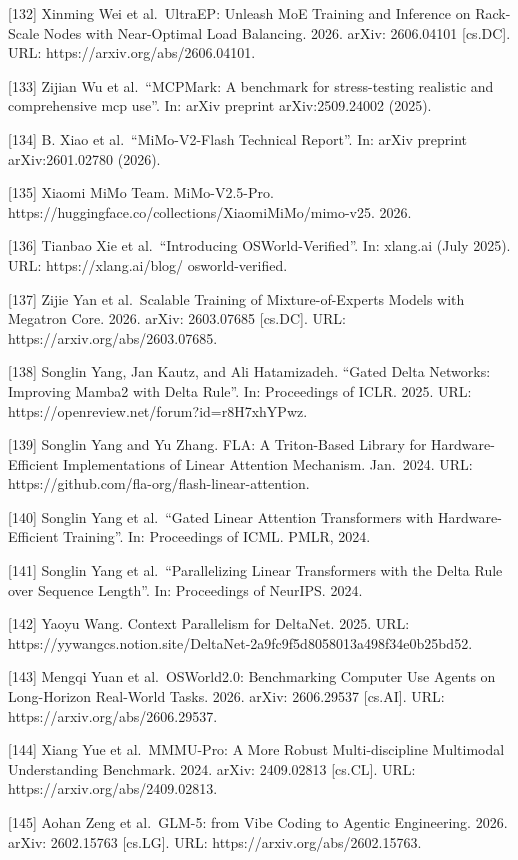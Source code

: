 \documentclass[
  10
]{article}
\begin{document}
{[}132{]} Xinming Wei et al.~UltraEP: Unleash MoE Training and Inference
on Rack-Scale Nodes with Near-Optimal Load Balancing. 2026. arXiv:
2606.04101 {[}cs.DC{]}. URL: https://arxiv.org/abs/2606.04101.

{[}133{]} Zijian Wu et al.~``MCPMark: A benchmark for stress-testing
realistic and comprehensive mcp use''. In: arXiv preprint
arXiv:2509.24002 (2025).

{[}134{]} B. Xiao et al.~``MiMo-V2-Flash Technical Report''. In: arXiv
preprint arXiv:2601.02780 (2026).

{[}135{]} Xiaomi MiMo Team. MiMo-V2.5-Pro.
https://huggingface.co/collections/XiaomiMiMo/mimo-v25. 2026.

{[}136{]} Tianbao Xie et al.~``Introducing OSWorld-Verified''. In:
xlang.ai (July 2025). URL: https://xlang.ai/blog/ osworld-verified.

{[}137{]} Zijie Yan et al.~Scalable Training of Mixture-of-Experts
Models with Megatron Core. 2026. arXiv: 2603.07685 {[}cs.DC{]}. URL:
https://arxiv.org/abs/2603.07685.

{[}138{]} Songlin Yang, Jan Kautz, and Ali Hatamizadeh. ``Gated Delta
Networks: Improving Mamba2 with Delta Rule''. In: Proceedings of ICLR.
2025. URL: https://openreview.net/forum?id=r8H7xhYPwz.

{[}139{]} Songlin Yang and Yu Zhang. FLA: A Triton-Based Library for
Hardware-Efficient Implementations of Linear Attention Mechanism.
Jan.~2024. URL: https://github.com/fla-org/flash-linear-attention.

{[}140{]} Songlin Yang et al.~``Gated Linear Attention Transformers with
Hardware-Efficient Training''. In: Proceedings of ICML. PMLR, 2024.

{[}141{]} Songlin Yang et al.~``Parallelizing Linear Transformers with
the Delta Rule over Sequence Length''. In: Proceedings of NeurIPS. 2024.

{[}142{]} Yaoyu Wang. Context Parallelism for DeltaNet. 2025. URL:
https://yywangcs.notion.site/DeltaNet-2a9fc9f5d8058013a498f34e0b25bd52.

{[}143{]} Mengqi Yuan et al.~OSWorld2.0: Benchmarking Computer Use
Agents on Long-Horizon Real-World Tasks. 2026. arXiv: 2606.29537
{[}cs.AI{]}. URL: https://arxiv.org/abs/2606.29537.

{[}144{]} Xiang Yue et al.~MMMU-Pro: A More Robust Multi-discipline
Multimodal Understanding Benchmark. 2024. arXiv: 2409.02813 {[}cs.CL{]}.
URL: https://arxiv.org/abs/2409.02813.

{[}145{]} Aohan Zeng et al.~GLM-5: from Vibe Coding to Agentic
Engineering. 2026. arXiv: 2602.15763 {[}cs.LG{]}. URL:
https://arxiv.org/abs/2602.15763.
\end{document}
